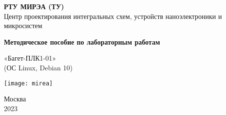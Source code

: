 \begin{titlepage}
	\begin{center}		
		\textbf{РТУ МИРЭА (ТУ)} \\
		Центр проектирования интегральных схем, устройств наноэлектроники и микросистем 
		
		\vspace{5.5cm}
		
		\Large
		\textbf{Методическое пособие по лабораторным работам}
		
		\vspace{0.5cm}
		
		«Багет-ПЛК1-01» \\
		(ОС Linux, Debian 10)
		
		\vfill
				
		\vspace{0.8cm}
		
		\texttt{[image: mirea]}
		
		\Large
		Москва\\
		2023
		
	\end{center}
\end{titlepage}	
